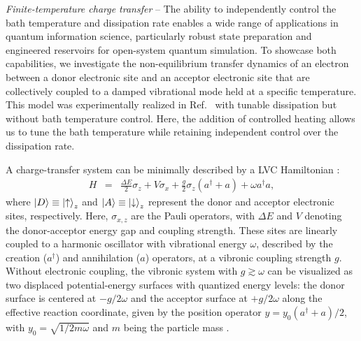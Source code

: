 \documentclass[
reprint,
superscriptaddress,

amsmath,amssymb,
aps,
prl,

floatfix,
]{revtex4-2}
\begin{document}

\emph{Finite-temperature charge transfer} -- The ability to independently control the bath temperature and dissipation rate enables a wide range of applications in quantum information science, particularly robust state preparation and engineered reservoirs for open-system quantum simulation. To showcase both capabilities, we investigate the non-equilibrium transfer dynamics of an electron between a donor electronic site and an acceptor electronic site that are collectively coupled to a damped vibrational mode held at a specific temperature. This model was experimentally realized in Ref.~\cite{so2024electrontransfer} with tunable dissipation but without bath temperature control.
Here, the addition of controlled heating allows us to tune the bath temperature while retaining independent control over the dissipation rate.

A charge-transfer system can be minimally described by a LVC Hamiltonian \cite{schlawin2021electrontransfer,so2024electrontransfer}:
\begin{eqnarray}
H &=& \frac{\Delta E}{2}\sigma_z + V \sigma_x + \frac{g}{2}\sigma_z (a^\dagger + a) + \omega a^\dagger a,
\label{eq_H}
\end{eqnarray}
where $\ket{D}\equiv\ket{\uparrow}_z$ and $\ket{A}\equiv\ket{\downarrow}_z$ represent the donor and acceptor electronic sites, respectively. Here, $\sigma_{x,z}$ are the Pauli operators, with $\Delta E$ and $V$ denoting the donor-acceptor energy gap and coupling strength. These sites are linearly coupled to a harmonic oscillator with vibrational energy $\omega$, described by the creation ($a^\dagger$) and annihilation ($a$) operators, at a vibronic coupling strength $g$. Without electronic coupling, the vibronic system with $g\gtrsim\omega$ can be visualized as two displaced potential-energy surfaces with quantized energy levels: the donor surface is centered at $-g/2\omega$ and the acceptor surface at $+g/2\omega$ along the effective reaction coordinate, given by the position operator $y = y_0(a^\dagger+a)/2$, with $y_0 = \sqrt{1/2m\omega}$ and $m$ being the particle mass \cite{schlawin2021electrontransfer,so2024electrontransfer}.
\end{document}
